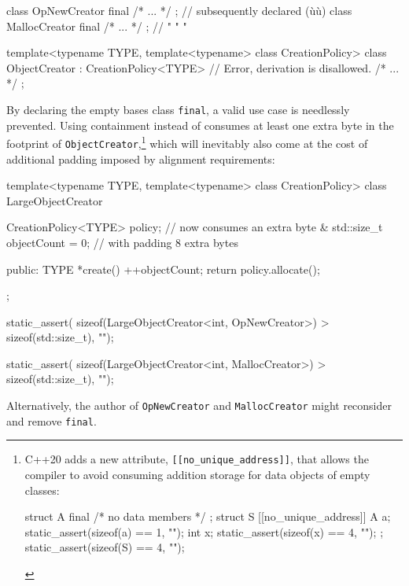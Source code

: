 {\begin{emcppslisting}[emcppsbatch=e12,emcppserrorlines={4,6}]
class OpNewCreator final { /* ... */ };   // subsequently declared (ù{}ù)
class MallocCreator final { /* ... */ };  //      "           "       "

template<typename TYPE, template<typename> class CreationPolicy>
class ObjectCreator : CreationPolicy<TYPE>  // Error, derivation is disallowed.
{ /* ... */ };
\end{emcppslisting}
    

\noindent By declaring the empty bases class \lstinline!final!, a valid use case is
needlessly prevented. Using containment instead of  consumes at least one extra byte in the footprint of
\lstinline!ObjectCreator!,{\cprotect\footnote{C++20 adds a new
attribute, \lstinline![[no_unique_address]]!, that allows the compiler
to avoid consuming addition storage for data objects of empty classes:

\begin{emcppslisting}[style=footcode,emcppsstandards={c++17}]
struct A final { /* no data members */ };
struct S {
    [[no_unique_address]] A a;  static_assert(sizeof(a) == 1, "");
    int x;                      static_assert(sizeof(x) == 4, "");
};                              static_assert(sizeof(S) == 4, "");
\end{emcppslisting}
      }} which will inevitably also come at the cost of additional
padding imposed by alignment requirements:

\begin{emcppslisting}[emcppsbatch=e11]
template<typename TYPE, template<typename> class CreationPolicy>
class LargeObjectCreator
{
    CreationPolicy<TYPE> policy;  // now consumes an extra byte &
    std::size_t objectCount = 0;  // with padding 8 extra bytes

public:
    TYPE *create()
    {
        ++objectCount;
        return policy.allocate();
    }
};

static_assert(
    sizeof(LargeObjectCreator<int, OpNewCreator>) > sizeof(std::size_t), "");

static_assert(
    sizeof(LargeObjectCreator<int, MallocCreator>) > sizeof(std::size_t), "");
\end{emcppslisting}
    

\noindent Alternatively, the author of \lstinline!OpNewCreator! and
\lstinline!MallocCreator! might reconsider and remove \lstinline!final!.

}
